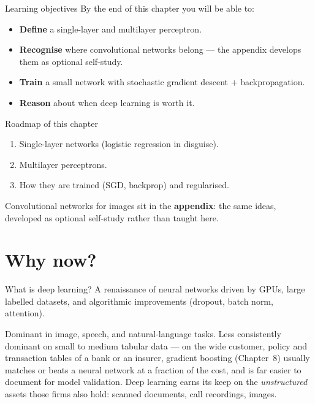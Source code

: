 \documentclass[aspectratio=169,11pt]{beamer}
\begin{document}
\begin{frame}{Learning objectives}
  By the end of this chapter you will be able to:
  \begin{itemize}
    \item \textbf{Define} a single-layer and multilayer perceptron.
    \item \textbf{Recognise} where convolutional networks belong ---
          the appendix develops them as optional self-study.
    \item \textbf{Train} a small network with stochastic gradient
          descent + backpropagation.
    \item \textbf{Reason} about when deep learning is worth it.
  \end{itemize}
\end{frame}


\begin{frame}{Roadmap of this chapter}
  \begin{takeaway}
    \begin{enumerate}
      \item Single-layer networks (logistic regression in disguise).
      \item Multilayer perceptrons.
      \item How they are trained (SGD, backprop) and regularised.
    \end{enumerate}
    Convolutional networks for images sit in the \textbf{appendix}: the same
    ideas, developed as optional self-study rather than taught here.
  \end{takeaway}
\end{frame}

\section{Why now?}

\begin{frame}{What is deep learning?}
  A renaissance of neural networks driven by GPUs, large labelled
  datasets, and algorithmic improvements (dropout, batch norm,
  attention).
  \begin{takeaway}
    Dominant in image, speech, and natural-language tasks. Less
    consistently dominant on small to medium tabular data --- on the wide
    customer, policy and transaction tables of a bank or an insurer,
    gradient boosting (Chapter~8) usually matches or beats a neural network
    at a fraction of the cost, and is far easier to document for model
    validation. Deep learning earns its keep on the \emph{unstructured}
    assets those firms also hold: scanned documents, call recordings, images.
  \end{takeaway}
\end{frame}
\end{document}
